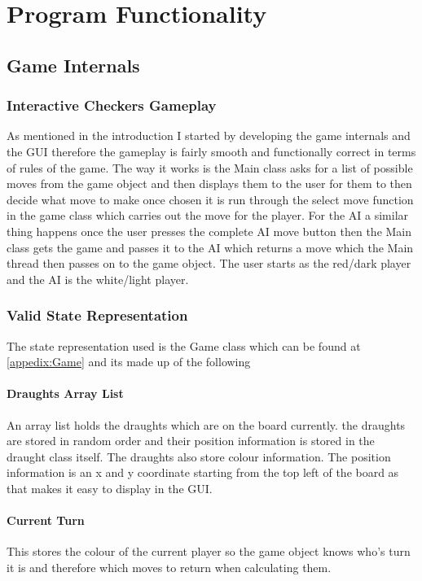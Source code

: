 \documentclass[a4paper,12pt]{scrartcl}
\begin{document}
	\section{Program Functionality}{
		\subsection{Game Internals}
		{
			\subsubsection{Interactive Checkers Gameplay}{
				As mentioned in the introduction I started by developing the game internals and the GUI therefore the gameplay is fairly smooth and functionally correct in terms of rules of the game. The way it works is the Main class asks for a list of possible moves from the game object and then displays them to the user for them to then decide what move to make once chosen it is run through the select move function in the game class which carries out the move for the player. For the AI a similar thing happens once the user presses the complete AI move button then the Main class gets the game and passes it to the AI which returns a move which the Main thread then passes on to the game object. 
				The user starts as the red/dark player and the AI is the white/light player.
			}
			\subsubsection{Valid State Representation}{
				The state representation used is the Game class which can be found at \cref{appedix:Game} and its made up of the following
				\paragraph{Draughts Array List}
				{
					An array list holds the draughts which are on the board currently. the draughts are stored in random order and their position information is stored in the draught class itself. The draughts also store colour information. The position information is an x and y coordinate starting from the top left of the board as that makes it easy to display in the GUI. 
				}
				\paragraph{Current Turn}
				{
					This stores the colour of the current player so the game object knows who's turn it is and therefore which moves to return when calculating them.
				}
				
}}}
\end{document}
